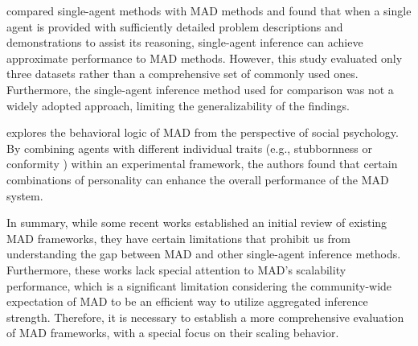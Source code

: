 \citet{wang2024rethinking} compared single-agent methods with MAD methods and found that when a single agent is provided with sufficiently detailed problem descriptions and demonstrations to assist its reasoning, single-agent inference can achieve approximate performance to MAD methods. However, this study evaluated only three datasets rather than a comprehensive set of commonly used ones. Furthermore, the single-agent inference method used for comparison was not a widely adopted approach, limiting the generalizability of the findings.

\citet{zhang2023exploring} explores the behavioral logic of MAD from the perspective of social psychology. By combining agents with different individual traits (e.g., stubbornness or conformity ) within an experimental framework, the authors found that certain combinations of personality can enhance the overall performance of the MAD system.


In summary, while some recent works established an initial review of existing MAD frameworks, they have certain limitations that prohibit us from understanding the gap between MAD and other single-agent inference methods. Furthermore, these works lack special attention to MAD's scalability performance, which is a significant limitation considering the community-wide expectation of MAD to be an efficient way to utilize aggregated inference strength. Therefore, it is necessary to establish a more comprehensive evaluation of MAD frameworks, with a special focus on their scaling behavior.